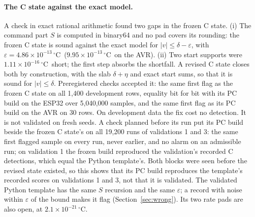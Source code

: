 \documentclass[11pt,a4paper]{article}
\newcommand{\degC}{\ensuremath{{}^\circ}C}
\newcommand{\sci}[2]{\ensuremath{#1\times10^{#2}}}
\begin{document}
\paragraph{The C state against the exact model.} A check in exact rational arithmetic found two gaps in the frozen C
state. (i) The command part $S$ is computed in binary64 and no pad covers its rounding: the frozen C state is sound
against the exact model for $|v|\le\delta-\varepsilon$, with $\varepsilon = \sci{4.86}{-13}$\,\degC\
(\sci{9.95}{-13}\,\degC\ on the AVR). (ii) Two start supports were \sci{1.11}{-16}\,\degC\ short; the first step absorbs
the shortfall. A revised C state closes both by construction, with the slab $\delta+\eta$ and exact start sums, so that
it is sound for $|v|\le\delta$. Preregistered checks accepted it: the same first flag as the frozen C state on all
1,400 development rows, equality bit for bit with its PC build on the ESP32 over 5,040,000 samples, and the same first
flag as its PC build on the AVR on 30 rows. On development data the fix cost no detection. It is not validated on
fresh seeds. A check planned before its run put its PC build beside the frozen C state's on all 19,200 runs of
validations 1 and 3: the same first flagged sample on every run, never earlier, and no alarm on an admissible run; on
validation 1 the frozen build reproduced the validation's recorded C detections, which equal the Python template's.
Both blocks were seen before the revised state existed, so this shows that its PC build reproduces the template's
recorded scores on validations 1 and 3, not that it is validated.
The validated Python template has the same $S$ recursion and the same $\varepsilon$; a record with noise
within $\varepsilon$ of the bound makes it flag (Section~\ref{sec:wrong}). Its two rate pads are also open, at
\sci{2.1}{-21}\,\degC.
\end{document}
